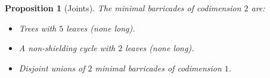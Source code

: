 \documentclass{amsart}
\newtheorem{prop}[proposition]{Proposition}
\theoremstyle{definition}
\theoremstyle{remark}
\numberwithin{equation}{section}
\newcommand{\0}{{\mathbf{0}}}
\begin{document}

\begin{prop}[Joints]
The minimal barricades of codimension $2$ are:
\begin{itemize}
	\item Trees with $5$ leaves (none long).
	\item A non-shielding cycle with $2$ leaves (none long).
	\item Disjoint unions of $2$ minimal barricades of codimension $1$.
\end{itemize}
\end{prop}
\end{document}
